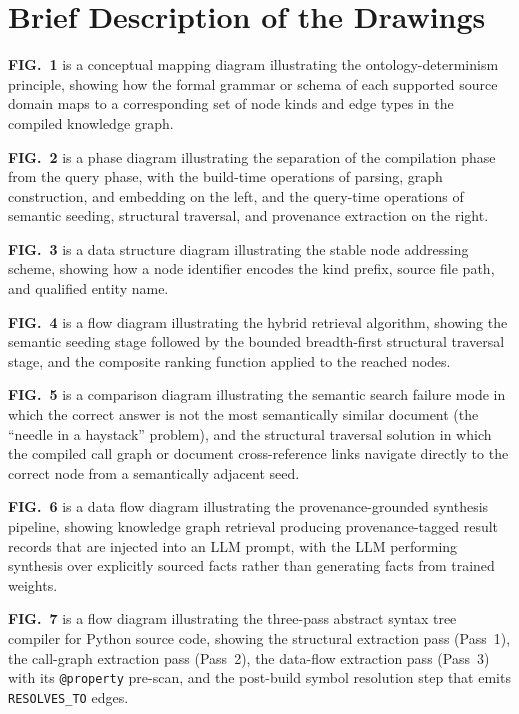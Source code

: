 \documentclass[12pt]{article}
\begin{document}
\section*{Brief Description of the Drawings}

\textbf{FIG.~1} is a conceptual mapping diagram illustrating the
ontology-determinism principle, showing how the formal grammar or schema of each
supported source domain maps to a corresponding set of node kinds and edge types
in the compiled knowledge graph.

\textbf{FIG.~2} is a phase diagram illustrating the separation of the compilation
phase from the query phase, with the build-time operations of parsing, graph
construction, and embedding on the left, and the query-time operations of
semantic seeding, structural traversal, and provenance extraction on the right.

\textbf{FIG.~3} is a data structure diagram illustrating the stable node
addressing scheme, showing how a node identifier encodes the kind prefix, source
file path, and qualified entity name.

\textbf{FIG.~4} is a flow diagram illustrating the hybrid retrieval algorithm,
showing the semantic seeding stage followed by the bounded breadth-first
structural traversal stage, and the composite ranking function applied to the
reached nodes.

\textbf{FIG.~5} is a comparison diagram illustrating the semantic search failure
mode in which the correct answer is not the most semantically similar document
(the ``needle in a haystack'' problem), and the structural traversal solution in
which the compiled call graph or document cross-reference links navigate directly
to the correct node from a semantically adjacent seed.

\textbf{FIG.~6} is a data flow diagram illustrating the provenance-grounded
synthesis pipeline, showing knowledge graph retrieval producing provenance-tagged
result records that are injected into an LLM prompt, with the LLM performing
synthesis over explicitly sourced facts rather than generating facts from trained
weights.

\textbf{FIG.~7} is a flow diagram illustrating the three-pass abstract syntax
tree compiler for Python source code, showing the structural extraction pass
(Pass~1), the call-graph extraction pass (Pass~2), the data-flow extraction
pass (Pass~3) with its \texttt{@property} pre-scan, and the post-build symbol
resolution step that emits \texttt{RESOLVES\_TO} edges.
\end{document}

